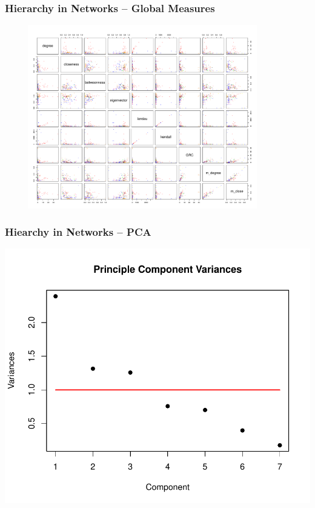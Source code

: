 \documentclass{beamer}
\newenvironment{changemargin}[2]{%
	\begin{list}{}{%
			\setlength{\topsep}{0pt}%
			\setlength{\leftmargin}{#1}%
			\setlength{\rightmargin}{#2}%
			\setlength{\listparindent}{\parindent}%
			\setlength{\itemindent}{\parindent}%
			\setlength{\parsep}{\parskip}%
		}%
		\item[]}{\end{list}}
\begin{document}
\begin{frame}\frametitle{Hierarchy in Networks -- Global Measures}
	\begin{changemargin}{-2cm}{ -2cm}
		\centering
		\includegraphics[width=12cm, height=8cm]{images/Global_Measure_Pairs_Plots.pdf}
	\end{changemargin}
\end{frame}

\begin{frame}\frametitle{Hiearchy in Networks -- PCA}
\begin{changemargin}{-2cm}{ -2cm}
		\centering
		\includegraphics[scale = 0.6]{images/Observed_PCA_Component_Varinces.pdf}
\end{changemargin}
\end{frame}
\end{document}
